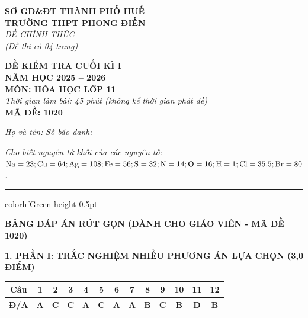 \documentclass[11pt,a4paper]{article}
\begin{document}
\begin{minipage}[t]{0.48\textwidth}
\textbf{SỞ GD\&ĐT THÀNH PHỐ HUẾ}\\
\textbf{TRƯỜNG THPT PHONG ĐIỀN}\\
\textit{ĐỀ CHÍNH THỨC}\\
\textit{(Đề thi có 04 trang)}
\end{minipage}
\hfill
\begin{minipage}[t]{0.48\textwidth}
\raggedleft
\textbf{\color{hfRed}ĐỀ KIỂM TRA CUỐI KÌ I}\\
\textbf{NĂM HỌC 2025 -- 2026}\\
\textbf{MÔN: HÓA HỌC LỚP 11}\\
\textit{Thời gian làm bài: 45 phút (không kể thời gian phát đề)}\\
\textbf{MÃ ĐỀ: 1020}
\end{minipage}

\vspace{4pt}
\noindent
\textit{Họ và tên:} \dotfill \textit{Số báo danh:} \dotfill

\vspace{3pt}
\noindent
\textit{\footnotesize Cho biết nguyên tử khối của các nguyên tố: $\ce{Na} = 23; \ce{Cu} = 64; \ce{Ag} = 108; \ce{Fe} = 56; \ce{S} = 32; \ce{N} = 14; \ce{O} = 16; \ce{H} = 1; \ce{Cl} = 35{,}5; \ce{Br} = 80$.}

\vspace{3pt}
\hrule color{hfGreen} height 0.5pt

\vspace{6pt}
\begin{center}
{\large\bfseries\color{hfRed} BẢNG ĐÁP ÁN RÚT GỌN (DÀNH CHO GIÁO VIÊN - MÃ ĐỀ 1020)}
\end{center}

\vspace{4pt}
{\bfseries\color{mainGreen} 1. PHẦN I: TRẮC NGHIỆM NHIỀU PHƯƠNG ÁN LỰA CHỌN (3,0 ĐIỂM)}

\vspace{2pt}
\begin{center}
\renewcommand{\arraystretch}{1.2}
\begin{tabular}{|c|c|c|c|c|c|c|c|c|c|c|c|c|}
\hline
\rowcolor{tableGreen}
\textbf{Câu} & \textbf{1} & \textbf{2} & \textbf{3} & \textbf{4} & \textbf{5} & \textbf{6} & \textbf{7} & \textbf{8} & \textbf{9} & \textbf{10} & \textbf{11} & \textbf{12} \\ \hline
\textbf{Đ/A} & \textbf{\color{hfRed}A} & \textbf{\color{hfRed}C} & \textbf{\color{hfRed}C} & \textbf{\color{hfRed}A} & \textbf{\color{hfRed}C} & \textbf{\color{hfRed}A} & \textbf{\color{hfRed}A} & \textbf{\color{hfRed}B} & \textbf{\color{hfRed}C} & \textbf{\color{hfRed}B} & \textbf{\color{hfRed}D} & \textbf{\color{hfRed}B} \\ \hline
\end{tabular}
\end{center}
\end{document}
